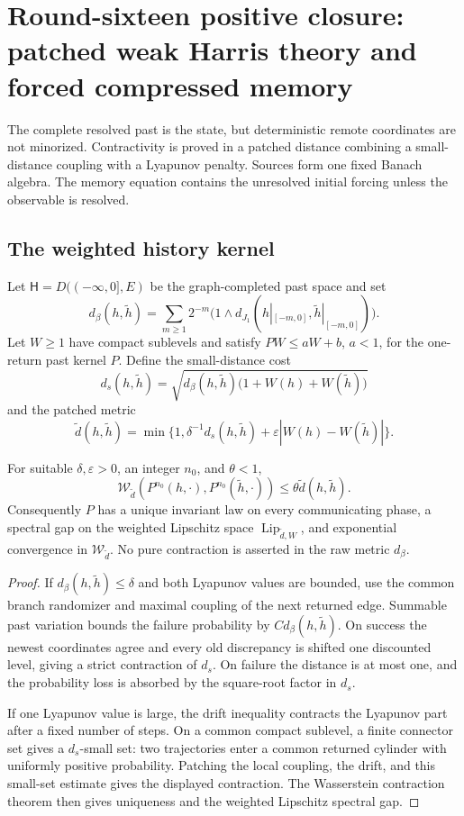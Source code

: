 \section{Round-sixteen positive closure: patched weak Harris theory and forced compressed memory}
\label{sec:r16-a4}

The complete resolved past is the state, but deterministic remote coordinates
are not minorized.  Contractivity is proved in a patched distance combining a
small-distance coupling with a Lyapunov penalty.  Sources form one fixed
Banach algebra.  The memory equation contains the unresolved initial forcing
unless the observable is resolved.

\subsection{The weighted history kernel}

Let \(\mathsf H=D(( -\infty,0],E)\) be the graph-completed past space and set
\[
 d_\beta(h,\tilde h)=\sum_{m\ge1}2^{-m}
  \bigl(1\wedge d_{J_1}(h|_{[-m,0]},\tilde h|_{[-m,0]})\bigr).
\]
Let \(W\ge1\) have compact sublevels and satisfy
\(PW\le aW+b\), \(a<1\), for the one-return past kernel \(P\).  Define the
small-distance cost
\[
 d_s(h,\tilde h)=\sqrt{d_\beta(h,\tilde h)
  \bigl(1+W(h)+W(\tilde h)\bigr)}
\]
and the patched metric
\[
 \widetilde d(h,\tilde h)=
 \min\{1,\delta^{-1}d_s(h,\tilde h)
       +\varepsilon|W(h)-W(\tilde h)|\}.
\]

\begin{theorem}
\label{thm:r16-a4-harris}
For suitable \(\delta,\varepsilon>0\), an integer \(n_0\), and
\(\theta<1\),
\[
 \mathcal W_{\widetilde d}(P^{n_0}(h,\cdot),
 P^{n_0}(\tilde h,\cdot))
 \le\theta\widetilde d(h,\tilde h).
\]
Consequently \(P\) has a unique invariant law on every communicating phase,
a spectral gap on the weighted Lipschitz space
\(\operatorname{Lip}_{\widetilde d,W}\), and exponential convergence in
\(\mathcal W_{\widetilde d}\).  No pure contraction is asserted in the raw
metric \(d_\beta\).
\end{theorem}

\begin{proof}
If \(d_\beta(h,\tilde h)\le\delta\) and both Lyapunov values are bounded, use
the common branch randomizer and maximal coupling of the next returned edge.
Summable past variation bounds the failure probability by
\(Cd_\beta(h,\tilde h)\).  On success the newest coordinates agree and every
old discrepancy is shifted one discounted level, giving a strict contraction
of \(d_s\).  On failure the distance is at most one, and the probability loss
is absorbed by the square-root factor in \(d_s\).

If one Lyapunov value is large, the drift inequality contracts the Lyapunov
part after a fixed number of steps.  On a common compact sublevel, a finite
connector set gives a \(d_s\)-small set: two trajectories enter a common
returned cylinder with uniformly positive probability.  Patching the local
coupling, the drift, and this small-set estimate gives the displayed
contraction.  The Wasserstein contraction theorem then gives uniqueness and
the weighted Lipschitz spectral gap.
\end{proof}

